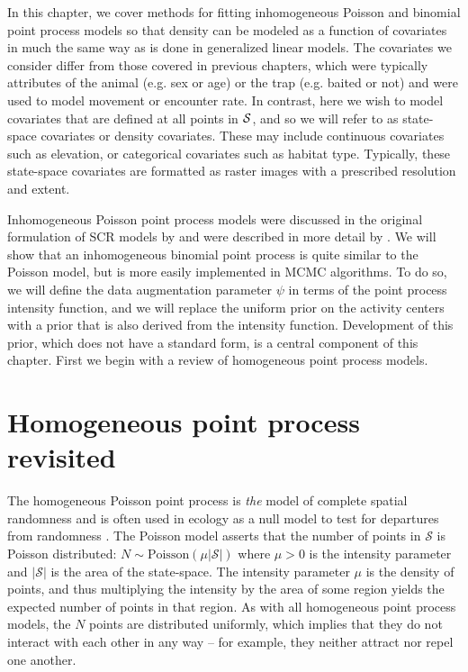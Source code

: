 In this chapter, we cover methods %
for fitting inhomogeneous Poisson and binomial
point process models so that density can be modeled as a
function of covariates in much the same way as is done in generalized linear
models. The covariates we consider differ
from those covered in previous chapters, which were typically
attributes of the animal (e.g. sex or age) or the trap (e.g. baited or
not) and were used to model movement or encounter
rate. In contrast, here we wish to model covariates that are defined
at all points in $\cal S$, and so we will refer to as
state-space covariates or density covariates. These may
include continuous covariates such as elevation, or categorical
covariates such as habitat type. Typically, these
state-space covariates are formatted
as raster images with a prescribed resolution and extent.

Inhomogeneous Poisson point process models were discussed in the original
formulation of SCR models by \citet{efford:2004} and were described in
more detail by \citet{borchers_efford:2008}. We will show that an
inhomogeneous binomial point process is quite similar to the Poisson
model, but is more easily implemented in MCMC algorithms. To do so, we
will define the data augmentation parameter $\psi$ in terms of the point
process intensity function, and we will replace the uniform prior on the
activity centers with a prior that is also derived from the intensity
function. Development of this prior, which does not have a
standard form, is a central component of this chapter. First we
begin with a review of homogeneous point process models.


\section{Homogeneous point process revisited}

The homogeneous Poisson point process is \textit{the} model of complete
spatial randomness and is often used in ecology as a null model
to test for departures from randomness
\citep{cressie:1992, diggle:2003, illian_etal:2008}.
The Poisson model asserts that the number of points in $\mathcal{S}$ is
Poisson distributed: $N \sim \text{Poisson}(\mu|\mathcal{S}|)$ where $\mu>0$ is
the intensity parameter and $|\mathcal{S}|$ is the area of the
state-space. The intensity parameter $\mu$
is the density of points, and thus multiplying the intensity by the area
of some region yields the expected number of points in that region.
As with all homogeneous point process models, the $N$ points are
distributed uniformly, which implies that they do not interact with each other in
any way -- for example, they neither attract nor repel one another.

